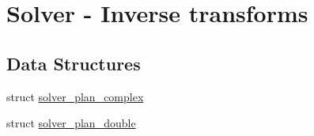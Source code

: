 \hypertarget{group__solver}{
\section{Solver - Inverse transforms}
\label{group__solver}
}
\subsection*{Data Structures}
\begin{CompactItemize}
\item 
struct \hyperlink{structsolver__plan__complex}{solver\_\-plan\_\-complex}
\item 
struct \hyperlink{structsolver__plan__double}{solver\_\-plan\_\-double}
\end{CompactItemize}
